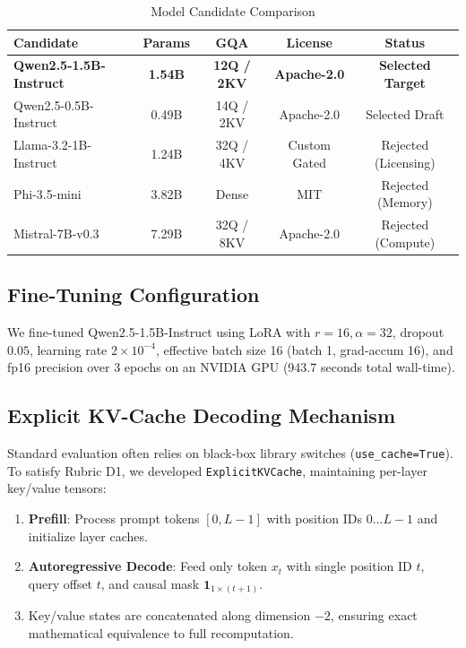 \documentclass[conference]{IEEEtran}
\begin{document}
\begin{table}[htbp]
\caption{Model Candidate Comparison}
\label{tab:model_selection}
\centering
\begin{tabular}{lcccc}
\toprule
\textbf{Candidate} & \textbf{Params} & \textbf{GQA} & \textbf{License} & \textbf{Status} \\
\midrule
\textbf{Qwen2.5-1.5B-Instruct} & \textbf{1.54B} & \textbf{12Q / 2KV} & \textbf{Apache-2.0} & \textbf{Selected Target} \\
Qwen2.5-0.5B-Instruct & 0.49B & 14Q / 2KV & Apache-2.0 & Selected Draft \\
Llama-3.2-1B-Instruct & 1.24B & 32Q / 4KV & Custom Gated & Rejected (Licensing) \\
Phi-3.5-mini & 3.82B & Dense & MIT & Rejected (Memory) \\
Mistral-7B-v0.3 & 7.29B & 32Q / 8KV & Apache-2.0 & Rejected (Compute) \\
\bottomrule
\end{tabular}
\end{table}

\subsection{Fine-Tuning Configuration}
We fine-tuned Qwen2.5-1.5B-Instruct using LoRA with $r=16, \alpha=32$, dropout $0.05$, learning rate $2 \times 10^{-4}$, effective batch size 16 (batch 1, grad-accum 16), and fp16 precision over 3 epochs on an NVIDIA GPU (943.7 seconds total wall-time).

\subsection{Explicit KV-Cache Decoding Mechanism}
Standard evaluation often relies on black-box library switches (\texttt{use\_cache=True}). To satisfy Rubric D1, we developed \texttt{ExplicitKVCache}, maintaining per-layer key/value tensors:
\begin{enumerate}
    \item \textbf{Prefill}: Process prompt tokens $[0, L-1]$ with position IDs $0 \dots L-1$ and initialize layer caches.
    \item \textbf{Autoregressive Decode}: Feed only token $x_t$ with single position ID $t$, query offset $t$, and causal mask $\mathbf{1}_{1 \times (t+1)}$.
    \item Key/value states are concatenated along dimension $-2$, ensuring exact mathematical equivalence to full recomputation.
\end{enumerate}
\end{document}
